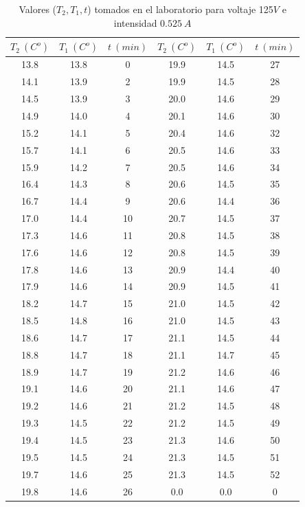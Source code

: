 \documentclass[12pt,a4paper]{article}
\begin{document}
\begin{table}[h!] 	 \centering 
\begin{tabular}{|c|c|c||c|c|c|} 
\hline 
$T_2 \ (C^o)$ & $T_1 \ (C^o) $ & $t \ (min)$ & $T_2 \ (C^o)$ & $T_1 \ (C^o) $ & $t \ (min)$ \\ \hline 
13.8 &  13.8 & 0 & 19.9 & 14.5 & 27 \\ 
14.1 &  13.9 & 2 & 19.9 & 14.5 & 28 \\ 
14.5 &  13.9 & 3 & 20.0 & 14.6 & 29 \\ 
14.9 &  14.0 & 4 & 20.1 & 14.6 & 30 \\ 
15.2 &  14.1 & 5 & 20.4 & 14.6 & 32 \\ 
15.7 &  14.1 & 6 & 20.5 & 14.6 & 33 \\ 
15.9 &  14.2 & 7 & 20.5 & 14.6 & 34 \\ 
16.4 &  14.3 & 8 & 20.6 & 14.5 & 35 \\ 
16.7 &  14.4 & 9 & 20.6 & 14.4 & 36 \\ 
17.0 &  14.4 & 10 & 20.7 & 14.5 & 37 \\ 
17.3 &  14.6 & 11 & 20.8 & 14.5 & 38 \\ 
17.6 &  14.6 & 12 & 20.8 & 14.5 & 39 \\ 
17.8 &  14.6 & 13 & 20.9 & 14.4 & 40 \\ 
17.9 &  14.6 & 14 & 20.9 & 14.5 & 41 \\ 
18.2 &  14.7 & 15 & 21.0 & 14.5 & 42 \\ 
18.5 &  14.8 & 16 & 21.0 & 14.5 & 43 \\ 
18.6 &  14.7 & 17 & 21.1 & 14.5 & 44 \\ 
18.8 &  14.7 & 18 & 21.1 & 14.7 & 45 \\ 
18.9 &  14.7 & 19 & 21.2 & 14.6 & 46 \\ 
19.1 &  14.6 & 20 & 21.1 & 14.6 & 47 \\ 
19.2 &  14.6 & 21 & 21.2 & 14.5 & 48 \\ 
19.3 &  14.5 & 22 & 21.2 & 14.5 & 49 \\ 
19.4 &  14.5 & 23 & 21.3 & 14.6 & 50 \\ 
19.5 &  14.5 & 24 & 21.3 & 14.5 & 51 \\ 
19.7 &  14.6 & 25 & 21.3 & 14.5 & 52 \\ 
19.8 &  14.6 & 26 & 0.0 & 0.0 & 0 \\ 
\hline 
\end{tabular} 
\caption{Valores ($T_2,T_1,t$) tomados en el laboratorio para voltaje 125$V$ e intensidad $0.525 \ A$} 
\label{tab:} 
\end{table} 
\end{document}
